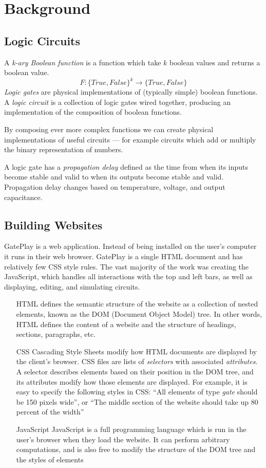 \chapter{Background}
\label{chapter:background}

\section{Logic Circuits}
\label{sec:circuits}
A \textit{k-ary Boolean function} is a function which take $k$ boolean values and returns a boolean value.
\[ F : \{True, False\}^k \rightarrow \{True, False\} \]
\textit{Logic gates} are physical implementations of (typically simple) boolean functions. A \textit{logic circuit} is a collection of logic gates wired together, producing an implementation of the composition of boolean functions.

By composing ever more complex functions we can create physical implementations of useful circuits --- for example circuits which add or multiply the binary representation of numbers.

A logic gate has a \textit{propagation delay} defined as the time from when its inputs become stable and valid to when its outputs become stable and valid. Propagation delay changes based on temperature, voltage, and output capacitance\cite{Wikipedia: Propagation Delay}.

\section{Building Websites}
GatePlay is a web application. Instead of being installed on the user's computer it runs in their web browser. GatePlay is a single HTML document and has relatively few CSS style rules. The vast majority of the work was creating the JavaScript, which handles all interactions with the top and left bars, as well as displaying, editing, and simulating circuits.

\begin{itemize}
	\item[HTML] defines the semantic structure of the website as a collection of nested elements, known as the DOM (Document Object Model) tree. In other words, HTML defines the content of a website and the structure of headings, sections, paragraphs, etc.
	
	\item[CSS] Cascading Style Sheets modify how HTML documents are displayed by the client's browser. CSS files are lists of \textit{selectors} with associated \textit{attributes}. A selector describes elements based on their position in the DOM tree, and its attributes modify how those elements are displayed. For example, it is easy to specify the following styles in CSS: ``All elements of type \textit{gate} should be 150 pixels wide'', or ``The middle section of the website should take up 80 percent of the width''
	
	\item[JavaScript] JavaScript is a full programming language which is run in the user's browser when they load the website. It can perform arbitrary computations, and is also free to modify the structure of the  DOM tree and the styles of elements
\end{itemize}

